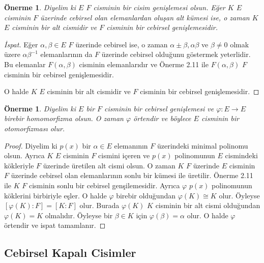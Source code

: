 \documentclass[draft]{article}
\newtheorem{prop}[thm]{Önerme}
\theoremstyle{definition}
\theoremstyle{remark}
\begin{document}
            \begin{prop}
                Diyelim ki $E$ $F$ cisminin bir cisim genişlemesi olsun. Eğer $K$ $E$ cisminin $F$ üzerinde cebirsel olan elemanlardan oluşan alt kümesi ise, o zaman $K$ $E$ cisminin bir alt cismidir ve $F$ cisminin bir cebirsel genişlemesidir.
            \end{prop}
            
            \begin{proof}[İspat]
                Eğer $\alpha, \beta \in E$ $F$ üzerinde cebirsel ise, o zaman $\alpha \pm \beta, \alpha\beta $ ve $\beta \neq 0$ olmak üzere $\alpha\beta^{-1}$ elemanlarının da $F$ üzerinde cebirsel olduğunu göstermek yeterlidir. Bu elemanlar $F(\alpha, \beta)$ cisminin elemanlarıdır ve Önerme 2.11 ile $F(\alpha, \beta)$ $F$ cisminin bir cebirsel genişlemesidir.\par
                O halde $K$ $E$ cisminin bir alt cismidir ve $F$ cisminin bir cebirsel genişlemesidir.
            \end{proof}
            
            \begin{prop}
                Diyelim ki $E$ bir $F$ cisminin bir cebirsel genişlemesi ve $\varphi: E \to E$ birebir homomorfizma olsun. O zaman $\varphi$ örtendir ve böylece $E$ cisminin bir otomorfizması olur.
            \end{prop}
            
            \begin{proof}
                Diyelim ki $p(x)$ bir $\alpha \in E$ elemanının $F$ üzerindeki minimal polinomu olsun. Ayrıca $K$ $E$ cisminin $F$ cismini içeren ve $p(x)$ polinomunun $E$ cismindeki kökleriyle $F$ üzerinde üretilen alt cismi olsun. O zaman $K$ $F$ üzerinde $E$ cisminin $F$ üzerinde cebirsel olan elemanlarının sonlu bir kümesi ile üretilir. Önerme 2.11 ile $K$ $F$ cisminin sonlu bir cebirsel genşilemesidir. Ayrıca $\varphi$ $p(x)$ polinomunun köklerini birbiriyle eşler. O halde $\varphi$ birebir olduğundan $\varphi(K) \cong K$ olur. Öyleyse $[\varphi(K) : F] = [K : F]$ olur. Burada $\varphi(K)$ $K$ cisminin bir alt cismi olduğundan $\varphi(K) = K$ olmalıdır. Öyleyse bir $\beta \in K$ için $\varphi(\beta) = \alpha$ olur. O halde $\varphi$ örtendir ve ispat tamamlanır.
            \end{proof}
            
        \subsection{Cebirsel Kapalı Cisimler}
        
\end{document}
